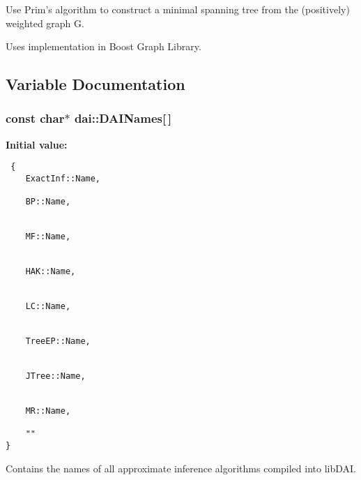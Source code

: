 Use Prim's algorithm to construct a minimal spanning tree from the (positively) weighted graph G. 

Uses implementation in Boost Graph Library. 

\subsection{Variable Documentation}
\hypertarget{namespacedai_faf76457d5d1ad9cfd37feb44ae94669}{
\subsubsection[DAINames]{\setlength{\rightskip}{0pt plus 5cm}const char$\ast$ {\bf dai::DAINames}\mbox{[}$\,$\mbox{]}}}
\label{namespacedai_faf76457d5d1ad9cfd37feb44ae94669}


\textbf{Initial value:}

\begin{Code}\begin{verbatim} {
    ExactInf::Name,

    BP::Name, 


    MF::Name,


    HAK::Name,


    LC::Name,


    TreeEP::Name,


    JTree::Name,


    MR::Name,

    ""
}
\end{verbatim}
\end{Code}
Contains the names of all approximate inference algorithms compiled into libDAI. 

